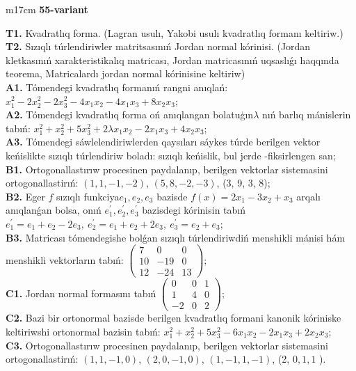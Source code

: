\documentclass{article}
\begin{document}
\begin{tabular}{m{17cm}}
\textbf{55-variant}
\newline

\textbf{T1.} Kvadratlıq forma. (Lagran usulı, Yakobi usulı kvadratlıq formanı keltiriw.) \\
\textbf{T2.} Sızıqlı túrlendiriwler matritsasınıń Jordan normal kórinisi. (Jordan kletkasınıń xarakteristikalıq matricası, Jordan matricasınıń uqsaslıǵı haqqında teorema,  Matricalardı jordan normal kórinisine keltiriw) \\
\textbf{A1.} Tómendegi kvadratlıq formanıń rangni anıqlań: \(x_{1}^{2} - 2x_{2}^{2} - 2x_{3}^{2} - 4x_{1}x_{2} - 4x_{1}x_{3} + 8x_{2}x_{3}\); \\
\textbf{A2.} Tómendegi kvadratlıq forma oń anıqlangan bolatuģın\(\lambda\) nıń barlıq mánislerin tabıń: \(x_{1}^{2} + x_{2}^{2} + 5x_{3}^{2} + 2\lambda x_{1}x_{2} - 2x_{1}x_{3} + 4x_{2}x_{3}\); \\
\textbf{A3.} Tómendegi sáwlelendiriwlerden qaysıları sáykes túrde berilgen vektor keńislikte sızıqlı túrlendiriw boladı: sızıqlı keńislik, bul jerde -fiksirlengen san; \\
\textbf{B1.} Ortogonallastırıw procesinen paydalanıp, berilgen vektorlar sistemasini ortogonallastirıń: \((1,1, - 1, - 2)\), \((5,8, - 2, - 3)\), (3, 9, 3, 8); \\
\textbf{B2.} Eger \(f\) sızıqlı funkciya\(e_{1},e_{2},e_{3}\) bazisde \(f(x) = 2x_{1} - 3x_{2} + x_{3}\) arqalı anıqlanǵan bolsa, onıń \(e_{1}^{'},e_{2}^{'},e_{3}^{'}\) bazisdegi kórinisin tabıń\(e_{1}^{'} = e_{1} + e_{2} - 2e_{3},\ e_{2}^{'} = e_{1} + e_{2} + 2e_{3},\ e_{3}^{'} = e_{2} + e_{3}\); \\
\textbf{B3.} Matricası tómendegishe bolǵan sızıqlı túrlendiriwdiń menshikli mánisi hám menshikli vektorların tabıń: \(\begin{pmatrix} 7 & 0 & 0 \\ 10 & - 19 & 0 \\ 12 & - 24 & 13 \end{pmatrix}\); \\
\textbf{C1.} Jordan normal formasını tabıń \(\begin{pmatrix} 0 & 0 & 1 \\ 1 & 4 & 0 \\  - 2 & 0 & 2 \end{pmatrix}\); \\
\textbf{C2.} Bazi bir ortonormal bazisde berilgen kvadratlıq formani kanonik kóriniske keltiriwshi ortonormal bazisin tabıń: \(x_{1}^{2} + x_{2}^{2} + 5x_{3}^{2} - 6x_{1}x_{2} - 2x_{1}x_{3} + 2x_{2}x_{3}\); \\
\textbf{C3.} Ortogonallastırıw procesinen paydalanıp, berilgen vektorlar sistemasini ortogonallastirıń: \((1,1, - 1,0)\), \((2,0, - 1,0)\), \((1, - 1,1, - 1)\), (2, \(0,1,1\) ). \\

\end{tabular}
\vspace{1cm}
\end{document}
